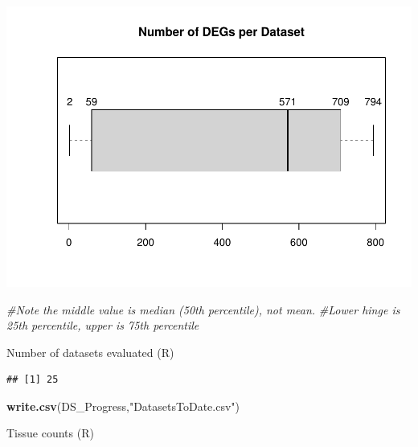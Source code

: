 \documentclass[
]{article}
\newenvironment{Shaded}{\begin{snugshade}}{\end{snugshade}}
\newcommand{\CommentTok}[1]{\textcolor[rgb]{0.56,0.35,0.01}{\textit{#1}}}
\newcommand{\DecValTok}[1]{\textcolor[rgb]{0.00,0.00,0.81}{#1}}
\newcommand{\KeywordTok}[1]{\textcolor[rgb]{0.13,0.29,0.53}{\textbf{#1}}}
\newcommand{\NormalTok}[1]{#1}
\newcommand{\OperatorTok}[1]{\textcolor[rgb]{0.81,0.36,0.00}{\textbf{#1}}}
\newcommand{\StringTok}[1]{\textcolor[rgb]{0.31,0.60,0.02}{#1}}
\begin{document}
\includegraphics{Thesis_DualCodeTest_files/figure-latex/unnamed-chunk-37-1.pdf}

\begin{Shaded}
\begin{Highlighting}[]
\CommentTok{#Note the middle value is median (50th percentile), not mean.}
\CommentTok{#Lower hinge is 25th percentile, upper is 75th percentile}
\end{Highlighting}
\end{Shaded}

Number of datasets evaluated (R)

\begin{Shaded}
\end{Shaded}

\begin{verbatim}
## [1] 25
\end{verbatim}

\begin{Shaded}
\begin{Highlighting}[]
\KeywordTok{write.csv}\NormalTok{(DS_Progress,}\StringTok{"DatasetsToDate.csv"}\NormalTok{)}
\end{Highlighting}
\end{Shaded}

Tissue counts (R)
\end{document}
